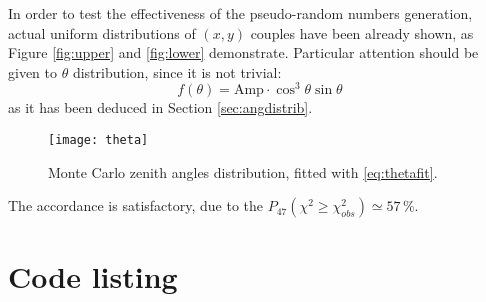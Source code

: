 
In order to test the effectiveness of the pseudo-random numbers generation, actual uniform distributions of $\left(x,y\right)$ couples have been already shown, as Figure \ref{fig:upper} and \ref{fig:lower} demonstrate. Particular attention should be given to $\theta$ distribution, since it is not trivial:
\begin{equation}\label{eq:thetafit}
f(\theta) = \textrm{Amp}\cdot \cos^3\theta\sin\theta
\end{equation}
as it has been deduced in Section \ref{sec:angdistrib}.

\begin{figure}[!htp]
	\centering
	\texttt{[image: theta]}
	\caption{Monte Carlo zenith angles distribution, fitted with \eqref{eq:thetafit}.}
\end{figure}

The accordance is satisfactory, due to the $P_{47}\left(\chi^2 \geq \chi^2_{obs}\right)\simeq 57\,\%$.



\section{Code listing} \label{app:eff_geom_MC}
